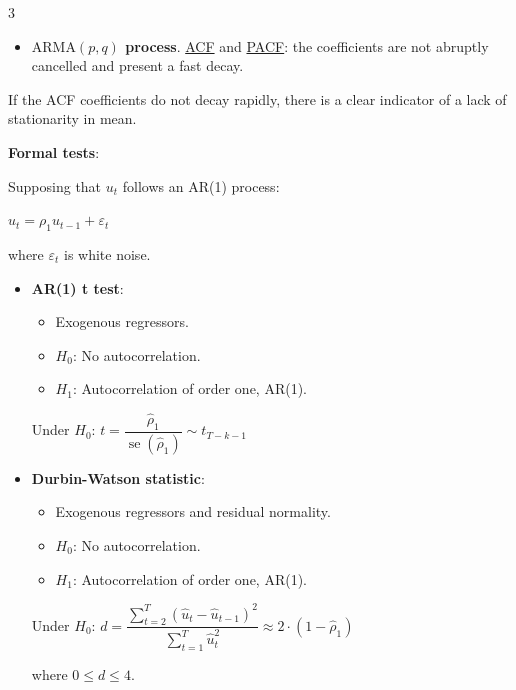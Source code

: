 \documentclass[10pt, a4paper, landscape]{article}
\DeclareMathOperator{\se}{se}
\begin{document}
\begin{multicols}{3}
\columnbreak

\begin{itemize}[leftmargin=*]
	\item \textbf{\( \text{ARMA}(p, q) \) process}. \underline{ACF} and \underline{PACF}: the coefficients are not abruptly cancelled and present a fast decay.
\end{itemize}

If the ACF coefficients do not decay rapidly, there is a clear indicator of a lack of stationarity in mean.

\textbf{Formal tests}:

Supposing that \( u_{t} \) follows an AR(1) process:

\begin{center}
	\( u_{t} = \rho_{1} u_{t - 1} + \varepsilon_{t} \)
\end{center}

where \( \varepsilon_{t} \) is white noise.

\begin{itemize}[leftmargin=*]
	\item \textbf{AR(1) t test}:
	\begin{itemize}[leftmargin=*]
		\item Exogenous regressors.
		\item \( H_{0} \): No autocorrelation.
		\item \( H_{1} \): Autocorrelation of order one, AR(1).
	\end{itemize}
	\begin{center}
		Under \( H_{0} \): \quad \( t = \dfrac{\hat{\rho}_{1}}{\se(\hat{\rho}_{1})} \sim t_{T - k - 1} \)
	\end{center}
\end{itemize}

\begin{itemize}[leftmargin=*]
	\item \textbf{Durbin-Watson statistic}:
	\begin{itemize}[leftmargin=*]
		\item Exogenous regressors and residual normality.
		\item \( H_{0} \): No autocorrelation.
		\item \( H_{1} \): Autocorrelation of order one, AR(1).
	\end{itemize}
	\begin{center}
		Under \( H_{0} \): \quad \( d = \dfrac{\sum_{t = 2}^{T} (\hat{u}_{t} - \hat{u}_{t - 1})^{2}}{\sum_{t = 1}^{T} \hat{u}_{t}^{2}} \approx 2 \cdot (1 - \hat{\rho}_{1}) \)
	\end{center}
	where \( 0 \leq d \leq 4 \).
\end{itemize}


\end{multicols}
\end{document}
